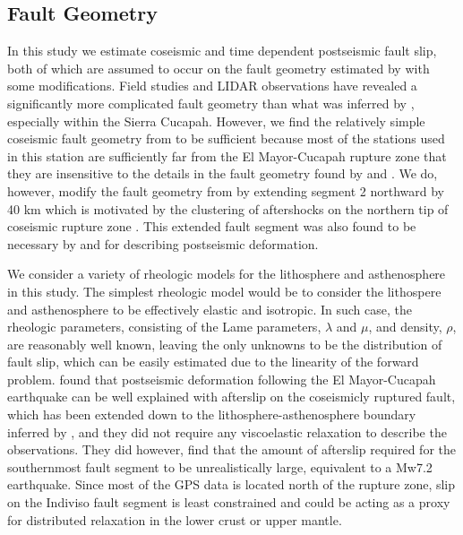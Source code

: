 \documentclass[12pt]{article}
\begin{document}
\subsection{Fault Geometry}
In this study we estimate coseismic and time dependent postseismic fault slip, both of which are assumed to occur on the fault geometry estimated by \cite{Wei2011a} with some modifications.  Field studies \cite{Fletcher2014} and LIDAR observations \cite{Oskin2012} have revealed a significantly more complicated fault geometry than what was inferred by \cite{Wei2011a}, especially within the Sierra Cucapah.  However, we find the relatively simple coseismic fault geometry from \cite{Wei2011a} to be sufficient because most of the stations used in this station are sufficiently far from the El Mayor-Cucapah rupture zone that they are insensitive to the details in the fault geometry found by \cite{Fletcher2014} and \cite{Oskin2012}.  We do, however, modify the fault geometry from \cite{Wei2011a} by extending segment 2 northward by 40 km which is motivated by the clustering of aftershocks on the northern tip of coseismic rupture zone \cite{Kroll2013} \cite{Hauksson2011}.  This extended fault segment was also found to be necessary by \cite{Rollins2015} and \cite{Pollitz2012} for describing postseismic deformation.     

We consider a variety of rheologic models for the lithosphere and asthenosphere in this study.  The simplest rheologic model would be to consider the lithospere and asthenosphere to be effectively elastic and isotropic. In such case, the rheologic parameters, consisting of the Lame parameters, $\lambda$ and $\mu$, and density, $\rho$, are reasonably well known, leaving the only unknowns to be the distribution of fault slip, which can be easily estimated due to the linearity of the forward problem. \cite{Rollins2015} found that postseismic deformation following the El Mayor-Cucapah earthquake can be well explained with afterslip on the coseismicly ruptured fault, which has been extended down to the lithosphere-asthenosphere boundary inferred by \cite{Lekic2011}, and they did not require any viscoelastic relaxation to describe the observations.  They did however, find that the amount of afterslip required for the southernmost fault segment to be unrealistically large, equivalent to a Mw7.2 earthquake.  Since most of the GPS data is located north of the rupture zone, slip on the Indiviso fault segment is least constrained and could be acting as a proxy for distributed relaxation in the lower crust or upper mantle. 
\end{document}
